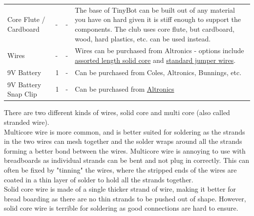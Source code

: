 \documentclass[a4paper,12pt]{article}
\begin{document}
\begin{xltabular}{\linewidth}{p{0.15\textwidth} p{0.05\textwidth} p{0.1\textwidth} X}
        Core Flute / Cardboard & - & - & The base of TinyBot can be built out of any material you have on hard given it is stiff enough to support the components. The club uses core flute, but cardboard, wood, hard plastics, etc. can be used instead.\\[2.5cm]
        Wires & - & - & Wires can be purchased from Altronics - options include \href{https://www.altronics.com.au/p/p1018a-prototyping-breadboard-wire-packs-350pcs/}{assorted length solid core} and \href{https://www.altronics.com.au/p/p1017-prototyping-jumper-wires-mixed-for-breadboard-arduino/}{standard jumper wires}. \\[1.5cm]
        9V Battery & 1 & - &  Can be purchased from Coles, Altronics, Bunnings, etc.\\[1cm]
        9V Battery Snap Clip & 1 & - & Can be purchased from \href{https://www.altronics.com.au/p/p0455-9v-battery-snap/}{Altronics} \\[1cm]
        \bottomrule
    \end{xltabular}
\pagebreak
\begin{notebox}
    There are two different kinds of wires, solid core and multi core (also called stranded wire). \\

    
    Multicore wire is more common, and is better suited for soldering as the strands in the two wires can mesh together and the solder wraps around all the strands forming a better bond between the wires. Multicore wire is annoying to use with breadboards as individual strands can be bent and not plug in correctly. This can often be fixed by "tinning" the wires, where the stripped ends of the wires are coated in a thin layer of solder to hold all the strands together.\\

    Solid core wire is made of a single thicker strand of wire, making it better for bread boarding as there are no thin strands to be pushed out of shape. However, solid core wire is terrible for soldering as good connections are hard to ensure. \\

\end{notebox}

\bigskip


\pagebreak


\pagebreak

\end{document}
